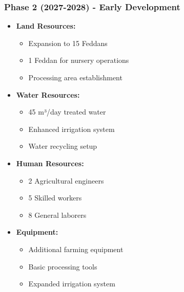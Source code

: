 \subsubsection{Phase 2 (2027-2028) - Early Development}
\begin{itemize}
    \item \textbf{Land Resources:}
    \begin{itemize}
        \item Expansion to 15 Feddans
        \item 1 Feddan for nursery operations
        \item Processing area establishment
    \end{itemize}
    \item \textbf{Water Resources:}
    \begin{itemize}
        \item 45 m³/day treated water
        \item Enhanced irrigation system
        \item Water recycling setup
    \end{itemize}
    \item \textbf{Human Resources:}
    \begin{itemize}
        \item 2 Agricultural engineers
        \item 5 Skilled workers
        \item 8 General laborers
    \end{itemize}
    \item \textbf{Equipment:}
    \begin{itemize}
        \item Additional farming equipment
        \item Basic processing tools
        \item Expanded irrigation system
    \end{itemize}
\end{itemize}

